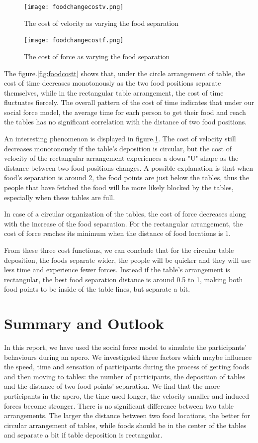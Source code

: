 \documentclass[11pt]{article}
\begin{document}
\begin{figure}[ht!]
\centering
\texttt{[image: foodchangecostv.png]}
\caption{The cost of velocity as varying the food separation}
\label{fig:foodcostv}
\end{figure}

\begin{figure}[ht!]
\centering
\texttt{[image: foodchangecostf.png]}
\caption{The cost of force as varying the food separation}
\label{fig:foodcostf}
\end{figure}
The figure.\ref{fig:foodcostt} shows that, under the circle arrangement of table, the cost of time decreases monotonously as the two food positions separate themselves, while in the rectangular table arrangement, the cost of time fluctuates fiercely. The overall pattern of the cost of time indicates that under our social force model, the average time for each person to get their food and reach the tables has no significant correlation with the distance of two food positions.

An interesting phenomenon is displayed in figure.\ref{fig:foodcostv}. The cost of velocity still decreases monotonously if the table's deposition is circular, but the cost of velocity of the rectangular arrangement experiences a down-"U" shape as the distance between two food positions changes. A possible explanation is that when food's separation is around 2, the food points are just below the tables, thus the people that have fetched the food will be more likely blocked by the tables, especially when these tables are full.

In case of a circular organization of the tables, the cost of force decreases along with the increase of the food separation. For the rectangular arrangement, the cost of force reaches its minimum when the distance of food locations is 1.

From these three cost functions, we can conclude that for the circular table deposition, the foods separate wider, the people will be quicker and they will use less time and experience fewer forces. Instead if the table's arrangement is rectangular, the best food separation distance is around 0.5 to 1, making both food points to be inside of the table lines, but separate a bit.

\section{Summary and Outlook}
In this report, we have used the social force model to simulate the participants' behaviours during an apero. We investigated three factors which maybe influence the speed, time and sensation of participants during the process of getting foods and then moving to tables: the number of participants, the deposition of tables and the distance of two food points' separation. We find that the more participants in the apero, the time used longer, the velocity smaller and induced forces become stronger. There is no significant difference between two table arrangements. The larger the distance between two food locations, the better for circular arrangement of tables, while foods should be in the center of the tables and separate a bit if table deposition is rectangular.
\end{document}
